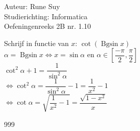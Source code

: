 \documentclass[a4paper]{article}
\newcommand{\Bgsin}{\operatorname{Bgsin}}
\begin{document}
  
\noindent \large Auteur: Rune Suy \\
\noindent \large Studierichting: Informatica\\
\noindent \large Oefeningenreeks 2B nr. 1.10\\

\medskip

\normalsize

Schrijf in functie van $x$: $\cot(\Bgsin x)$\\

$\alpha = \Bgsin x\Leftrightarrow x = \sin \alpha$ en $\alpha \in \left[ \dfrac{-\pi}{2}, \dfrac{\pi}{2} \right]$\\

$\cot^2\alpha + 1 =  \dfrac{1}{\sin^2\alpha}$\\

$\Leftrightarrow \cot^2 \alpha = \dfrac{1}{\sin^2\alpha} - 1 = \dfrac{1}{x^2}-1$\\

$\Leftrightarrow \cot \alpha = \sqrt{\dfrac{1}{x^2} - 1} = \dfrac{\sqrt{1-x^2}}{x}$\\

\begin{thebibliography}{999}
\end{thebibliography}
\end{document}
